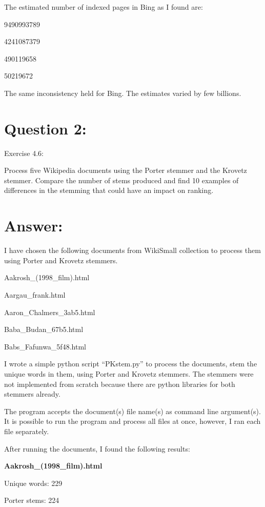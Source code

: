 \documentclass[a4paper, 11pt]{article}
\begin{document}
The estimated number of indexed pages in Bing as I found are:

9490993789

4241087379

490119658

50219672

The same inconsistency held for Bing. The estimates varied by few billions.


\section*{Question 2:}
Exercise 4.6:

Process five Wikipedia documents using the Porter stemmer and the Krovetz stemmer. Compare the number of stems produced and find 10 examples of differences in the stemming that could have an impact on ranking.

\section*{Answer:}

I have chosen the following documents from WikiSmall collection to process them using Porter and Krovetz stemmers.

Aakrosh\_(1998\_film).html

Aargau\_frank.html

Aaron\_Chalmers\_3ab5.html

Baba\_Budan\_67b5.html

Babs\_Fafunwa\_5f48.html

I wrote a simple python script ``PKstem.py'' to process the documents, stem the unique words in them, using Porter and Krovetz stemmers. The stemmers were not implemented from scratch because there are python libraries for both stemmers already.



The program accepts the document(s) file name(s) as command line argument(s). It is possible to run the program and process all files at once, however, I ran each file separately.

After running the documents, I found the following results:

\textbf{Aakrosh\_(1998\_film).html}

Unique words: 229

Porter stems: 224
\end{document}
